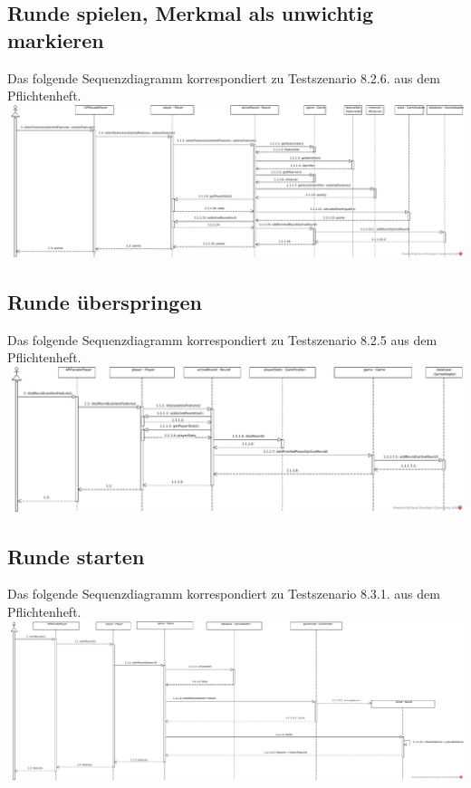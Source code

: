 \documentclass[a4paper]{scrreprt}
\begin{document}
	\subsection{Runde spielen, Merkmal als unwichtig markieren}
	Das folgende Sequenzdiagramm korrespondiert zu Testszenario 8.2.6. aus dem Pflichtenheft. \\
	\includegraphics[width=\textwidth]{img/RundeSpielen.pdf}

	\subsection{Runde überspringen}
	Das folgende Sequenzdiagramm korrespondiert zu Testszenario 8.2.5 aus dem Pflichtenheft. \\
	\includegraphics[width=\textwidth]{img/RundeUeberspringen.pdf}

	\subsection{Runde starten}
	Das folgende Sequenzdiagramm korrespondiert zu Testszenario 8.3.1. aus dem Pflichtenheft. \\
	\includegraphics[width=\textwidth]{img/RundeStarten.pdf}
\end{document}
